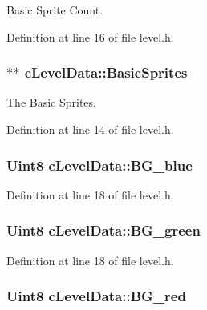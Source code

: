 Basic Sprite Count. 



Definition at line 16 of file level.\-h.

\hypertarget{classc_level_data_a9c5bdbf1a2c53e5acf84f81e31dec1cd}{
\subsubsection[{Basic\-Sprites}]{$\ast$$\ast$ c\-Level\-Data\-::\-Basic\-Sprites}}\label{classc_level_data_a9c5bdbf1a2c53e5acf84f81e31dec1cd}


The Basic Sprites. 



Definition at line 14 of file level.\-h.

\hypertarget{classc_level_data_af36277b8d29192e8723faf6f74877411}{
\subsubsection[{B\-G\-\_\-blue}]{\setlength{\rightskip}{0pt plus 5cm}Uint8 c\-Level\-Data\-::\-B\-G\-\_\-blue}}\label{classc_level_data_af36277b8d29192e8723faf6f74877411}


Definition at line 18 of file level.\-h.

\hypertarget{classc_level_data_a3be580b2f98fc788308a1bf190ca44eb}{
\subsubsection[{B\-G\-\_\-green}]{\setlength{\rightskip}{0pt plus 5cm}Uint8 c\-Level\-Data\-::\-B\-G\-\_\-green}}\label{classc_level_data_a3be580b2f98fc788308a1bf190ca44eb}


Definition at line 18 of file level.\-h.

\hypertarget{classc_level_data_a67b8f058169d63282536061937cd6a53}{
\subsubsection[{B\-G\-\_\-red}]{\setlength{\rightskip}{0pt plus 5cm}Uint8 c\-Level\-Data\-::\-B\-G\-\_\-red}}\label{classc_level_data_a67b8f058169d63282536061937cd6a53}


